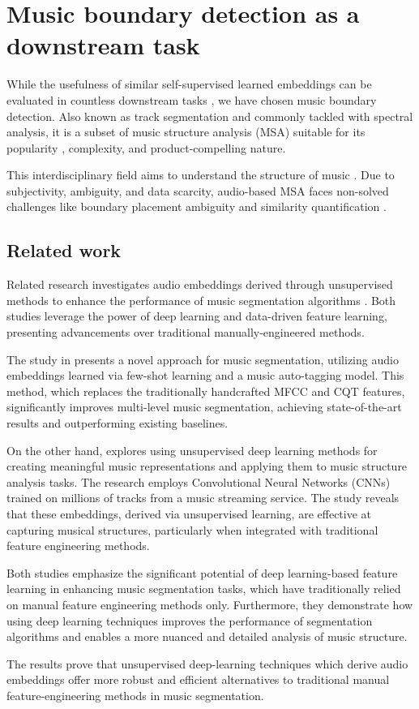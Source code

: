 \section{Music boundary detection as a downstream task}

While the usefulness of similar self-supervised learned embeddings can be evaluated in countless downstream tasks \cite{Li2023MERT:Training, Kim2020OneStrategies}, we have chosen music boundary detection. Also known as track segmentation and commonly tackled with spectral analysis, it is a subset of music structure analysis (MSA) suitable for its popularity \cite{Smith2013ATask}, complexity, and product-compelling nature. 

This interdisciplinary field aims to understand the structure of music \cite{Nieto2020Audio-BasedApplications}. Due to subjectivity, ambiguity, and data scarcity, audio-based MSA faces non-solved challenges like boundary placement ambiguity and similarity quantification \cite{NietoPerceptualMusic}.  

\subsection{Related work}

Related research investigates audio embeddings derived through unsupervised methods to enhance the performance of music segmentation algorithms \cite{deepfeaturesegment, SalamonDeepSegmentation}. Both studies leverage the power of deep learning and data-driven feature learning, presenting advancements over traditional manually-engineered methods.

The study in \cite{deepfeaturesegment} presents a novel approach for music segmentation, utilizing audio embeddings learned via few-shot learning and a music auto-tagging model. This method, which replaces the traditionally handcrafted MFCC and CQT features, significantly improves multi-level music segmentation, achieving state-of-the-art results and outperforming existing baselines.

On the other hand, \cite{SalamonDeepSegmentation} explores using unsupervised deep learning methods for creating meaningful music representations and applying them to music structure analysis tasks. The research employs Convolutional Neural Networks (CNNs) trained on millions of tracks from a music streaming service. The study reveals that these embeddings, derived via unsupervised learning, are effective at capturing musical structures, particularly when integrated with traditional feature engineering methods.

Both studies emphasize the significant potential of deep learning-based feature learning in enhancing music segmentation tasks, which have traditionally relied on manual feature engineering methods only. Furthermore, they demonstrate how using deep learning techniques improves the performance of segmentation algorithms and enables a more nuanced and detailed analysis of music structure. 

The results prove that unsupervised deep-learning techniques which derive audio embeddings offer more robust and efficient alternatives to traditional manual feature-engineering methods in music segmentation.

